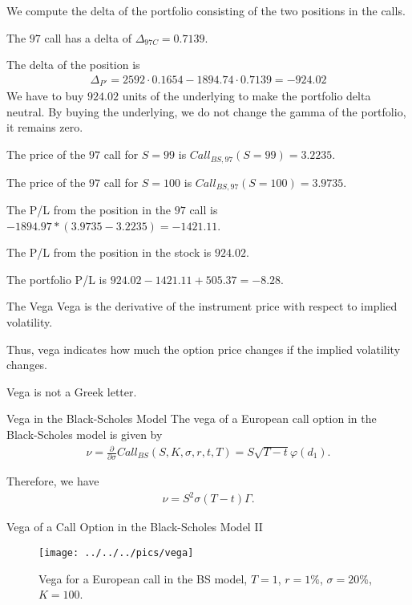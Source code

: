 		We compute the delta of the portfolio consisting of the two positions in
		the calls.
		
		The $97$ call has a delta of $\Delta_{97C}=0.7139$.
		
		The delta of the position is
			\begin{align*}
				\Delta_{P'} = 2592 \cdot 0.1654 - 1894.74 \cdot 0.7139 = -924.02
			\end{align*}
		We have to buy $924.02$ units of the underlying to make the portfolio
		delta neutral. By buying the underlying, we do not change the gamma of the
		portfolio, it remains zero.

		The price of the $97$ call for $S=99$ is $Call_{BS,97}(S=99)=3.2235$.
		
		The price of the $97$ call for $S=100$ is $Call_{BS,97}(S=100)=3.9735$.
		
		The P/L from the position in the $97$ call is
		$-1894.97*(3.9735-3.2235)=-1421.11$.
		
		The P/L from the position in the stock is $924.02$.
		
		The portfolio P/L is $924.02-1421.11+505.37=-8.28.$


The Vega
	Vega is the derivative of the instrument price with respect to
  implied volatility.
	
	Thus, vega indicates how much the option price changes if the implied
  volatility changes.
	
	Vega is not a Greek letter.



Vega in the Black-Scholes Model
	The vega of a European call option in the Black-Scholes model is given by
		\begin{align*}
			\nu = \frac{\partial}{\partial \sigma}Call_{BS}(S,K,\sigma,r,t,T) =
			S\sqrt{T-t} \varphi(d_1).
		\end{align*}

	Therefore, we have
		\begin{align*}
			\nu = S^2 \sigma (T-t) \Gamma.
		\end{align*}


Vega of a Call Option in the Black-Scholes Model II
	\begin{figure}[htp]
	\begin{center}
		\texttt{[image: ../../../pics/vega]}
		\caption{Vega for a European call in the BS model, $T=1$, $r=1\%$,
		$\sigma=20\%$, $K=100$.}
		\label{fig:vegaBS}
	\end{center}
	\end{figure}


